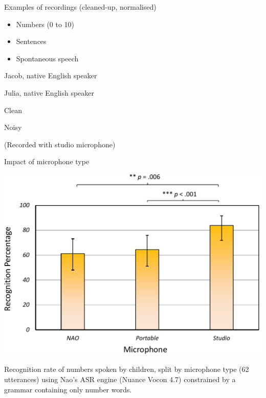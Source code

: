 \documentclass[compress]{beamer}
\begin{document}

\begin{frame}{Examples of recordings (cleaned-up, normalised)}

\begin{itemize}

\item
  Numbers (0 to 10)
\item
  Sentences
\item
  Spontaneous speech
\end{itemize}

Jacob, native English speaker

Julia, native English speaker

Clean

Noisy

(Recorded with studio microphone)

\end{frame}

\begin{frame}{Impact of microphone type}

    \begin{center}
        \includegraphics[width=0.8\linewidth]{mic_graph}
    \end{center}

Recognition rate of numbers spoken by children, split by microphone type
(62 utterances) using Nao's ASR engine (Nuance Vocon 4.7) constrained by
a grammar containing only number words.

\end{frame}
\end{document}

